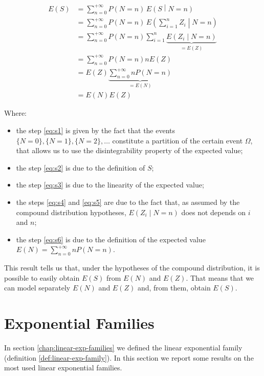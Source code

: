 \documentclass[a4paper, twoside, openright, 12pt]{report}
\providecommand{\tightlist}{%
  \setlength{\itemsep}{0pt}\setlength{\parskip}{0pt}}
\theoremstyle{definition}
\theoremstyle{definition}
\theoremstyle{definition}
\theoremstyle{remark}
\begin{document}
\begin{align}
\label{eq:s1}
E(S) & = \sum_{n=0}^{+\infty}{P(N=n) \, E\left(S \middle| N = n \right)}
\\ \label{eq:s2} & =
\sum_{n=0}^{+\infty}{P(N=n) \, E\left(\sum_{i=1}^{n}{Z_i} \middle| N = n \right)}
\\ \label{eq:s3} & =
\sum_{n=0}^{+\infty}{P(N=n) \sum_{i=1}^{n}{\underbrace{E\left( Z_i \middle| N = n \right)}_{=E(Z)}}}
\\ \label{eq:s4} & =
\sum_{n=0}^{+\infty}{P(N=n) n E(Z)}
\\ \label{eq:s5} & =
E(Z) \underbrace{\sum_{n=0}^{+\infty}{n P(N=n)}}_{=E(N)}
\\ \label{eq:s6} & =
E(N)E(Z)
\end{align}

Where:

\begin{itemize}
\tightlist
\item
  the step \eqref{eq:s1} is given by the fact that the events \(\{N=0\}, \{N=1\}, \{N=2\}, \dots\) constitute a partition of the certain event \(\Omega\), that allows us to use the disintegrability property of the expected value;
\item
  the step \eqref{eq:s2} is due to the definition of \(S\);
\item
  the step \eqref{eq:s3} is due to the linearity of the expected value;
\item
  the steps \eqref{eq:s4} and \eqref{eq:s5} are due to the fact that, as assumed by the compound distribution hypotheses, \(E\left( Z_i \middle| N = n \right)\) does not depends on \(i\) and \(n\);
\item
  the step \eqref{eq:s6} is due to the definition of the expected value \(E(N)=\sum_{n=0}^{+\infty}{n P(N=n)}\).
\end{itemize}

This result tells us that, under the hypotheses of the compound distribution, it is possible to easily obtain \(E(S)\) from \(E(N)\) and \(E(Z)\). That means that we can model separately \(E(N)\) and \(E(Z)\) and, from them, obtain \(E(S)\).

\newpage

\hypertarget{chap:appendix-exp-family}{%
\section{Exponential Families}\label{chap:appendix-exp-family}}

In section \ref{chap:linear-exp-families} we defined the linear exponential family (definition \ref{def:linear-exp-family}). In this section we report some results on the most used linear exponential families.
\end{document}
